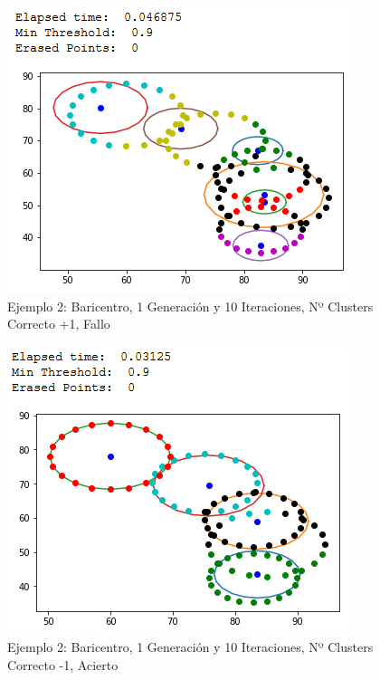\documentclass[conference,a4paper]{IEEEtran}
\begin{document}
\begin{figure}[H]
\centering
\includegraphics[scale=0.65]{Experimentacion/Ejemplo2/ej2_b_1_10_mc_wrong}
\caption{Ejemplo 2: Baricentro, 1 Generación y 10 Iteraciones,  Nº Clusters Correcto +1, Fallo\\}
\end{figure}

\begin{figure}[H]
\centering
\includegraphics[scale=0.65]{Experimentacion/Ejemplo2/ej2_b_1_10_lc_correct}
\caption{Ejemplo 2: Baricentro, 1 Generación y 10 Iteraciones,  Nº Clusters Correcto -1, Acierto\\}
\end{figure}
\end{document}
